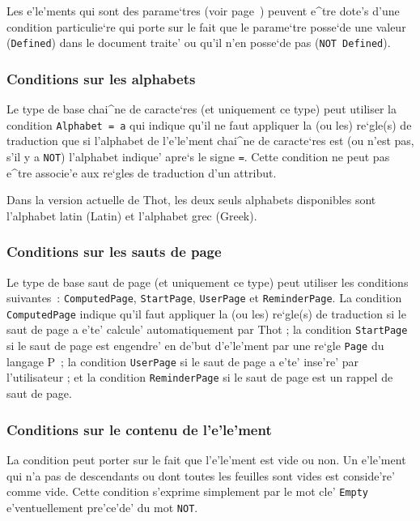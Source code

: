 {Les e'le'ments qui sont des parame`tres (voir page~\pageref{param}) peuvent
e^tre dote's d'une condition particulie`re qui porte sur le fait que le
parame`tre posse`de une valeur ({\tt Defined}) dans le document traite' ou
qu'il n'en posse`de pas ({\tt NOT Defined}).

\subsubsection{Conditions sur les alphabets}

Le type de base chai^ne de caracte`res (et uniquement ce type) peut
utiliser la condition {\tt Alphabet = a} qui indique qu'il ne faut
appliquer la (ou les) re`gle(s) de traduction que si l'alphabet
de l'e'le'ment chai^ne de caracte`res est (ou n'est pas, s'il y a {\tt NOT})
l'alphabet indique' apre`s le signe {\tt =}. Cette condition ne peut pas
e^tre associe'e aux re`gles de traduction d'un attribut.

Dans la version actuelle de Thot, les deux seuls alphabets disponibles
sont l'alphabet latin (Latin) et l'alphabet grec (Greek).

\subsubsection{Conditions sur les sauts de page}

Le type de base saut de page (et uniquement ce type) peut
utiliser les conditions suivantes~: {\tt ComputedPage}, {\tt StartPage},
{\tt UserPage} et {\tt ReminderPage}.
La condition {\tt ComputedPage} indique qu'il faut appliquer la (ou les)
re`gle(s) de traduction si le saut de page a e'te' calcule'
automatiquement par Thot ; la condition {\tt StartPage} 
si le saut de page est engendre' en de'but d'e'le'ment par une re`gle
{\tt Page} du langage P~; la
condition {\tt UserPage} si le saut de page
a e'te' inse're' par l'utilisateur ; et la condition {\tt ReminderPage}
si le saut de page est un rappel de saut de page.

\subsubsection{Conditions sur le contenu de l'e'le'ment}

La condition peut porter sur le fait que l'e'le'ment est vide ou non.
Un e'le'ment qui n'a pas de descendants ou dont toutes les feuilles
sont vides est conside're' comme vide.
Cette condition s'exprime simplement par le mot cle' {\tt Empty}
e'ventuellement pre'ce'de' du mot {\tt NOT}.

}
